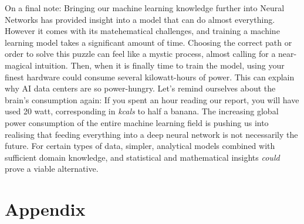 \documentclass{article}
\begin{document}
\begin{multicols}{2}
On a final note: Bringing our machine learning knowledge further into Neural Networks has provided insight into a model that can do almost everything. However it comes with its matehematical challenges, and training a machine learning model takes a significant amount of time.
Choosing the correct path or order to solve this puzzle can feel like a mystic process, almost calling for a near-magical intuition. Then, when it is finally time to train the model, using your finest hardware could consume several kilowatt-hours of power. This can explain why AI data centers are so power-hungry. Let's remind ourselves about the brain's consumption again: If you spent an hour reading our report, you will have used 20 watt,
corresponding in \textit{kcals} to half a banana. The increasing global power consumption of the entire machine learning field is pushing us into realising that feeding everything into a deep neural network is not necessarily the future. \cite{van_der_donckt_not_2023} For certain types of data, simpler, analytical models combined with sufficient domain knowledge, and statistical and mathematical insights \textit{could} prove a viable alternative. %


\end{multicols}



\newpage


\appendix
\section*{Appendix}
\end{document}
